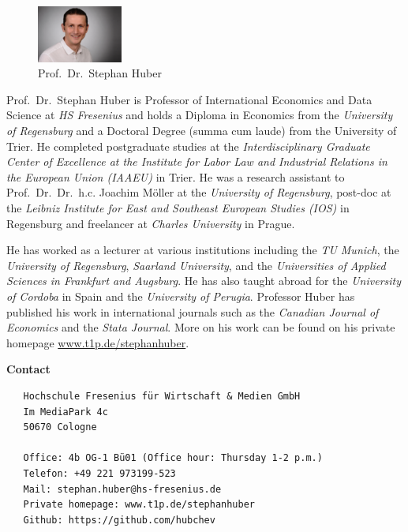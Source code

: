 \documentclass[
  12pt,
  oneside]{book}
\theoremstyle{definition}
\theoremstyle{definition}
\theoremstyle{definition}
\theoremstyle{definition}
\theoremstyle{remark}
\begin{document}
\begin{figure}
\centering
\includegraphics[width=0.25\textwidth,height=\textheight]{fig/huber2.jpeg}
\caption[\label{fig:itsme} Prof.~Dr.~Stephan Huber]{\label{fig:itsme} Prof.~Dr.~Stephan Huber\footnotemark{}}
\end{figure}

Prof.~Dr.~Stephan Huber is Professor of International Economics and Data Science at \emph{HS Fresenius} and holds a Diploma in Economics from the \emph{University of Regensburg} and a Doctoral Degree (summa cum laude) from the University of Trier. He completed postgraduate studies at the \emph{Interdisciplinary Graduate Center of Excellence at the Institute for Labor Law and Industrial Relations in the European Union (IAAEU)} in Trier. He was a research assistant to Prof.~Dr.~Dr.~h.c. Joachim Möller at the \emph{University of Regensburg}, post-doc at the \emph{Leibniz Institute for East and Southeast European Studies (IOS)} in Regensburg and freelancer at \emph{Charles University} in Prague.

He has worked as a lecturer at various institutions including the \emph{TU Munich}, the \emph{University of Regensburg}, \emph{Saarland University}, and the \emph{Universities of Applied Sciences in Frankfurt and Augsburg}. He has also taught abroad for the \emph{University of Cordoba} in Spain and the \emph{University of Perugia}. Professor Huber has published his work in international journals such as the \emph{Canadian Journal of Economics} and the \emph{Stata Journal}. More on his work can be found on his private homepage \href{https://www.t1p.de/stephanhuber}{www.t1p.de/stephanhuber}.

\textbf{Contact}

\begin{verbatim}
   Hochschule Fresenius für Wirtschaft & Medien GmbH
   Im MediaPark 4c
   50670 Cologne
   
   Office: 4b OG-1 Bü01 (Office hour: Thursday 1-2 p.m.)
   Telefon: +49 221 973199-523
   Mail: stephan.huber@hs-fresenius.de
   Private homepage: www.t1p.de/stephanhuber
   Github: https://github.com/hubchev
\end{verbatim}
\end{document}
